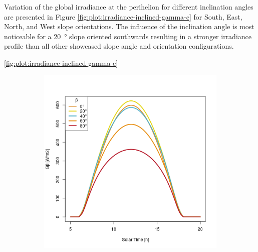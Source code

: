 Variation of the global irradiance at the perihelion for different inclination angles are presented in Figure \ref{fig:plot:irradiance-inclined-gamma-c} for South, East, North, and West slope orientations. The influence of the inclination angle is most noticeable for a \SI{20}{\degree} slope oriented southwards resulting in a stronger irradiance profile than all other showcased slope angle and orientation configurations.

\ref{fig:plot:irradiance-inclined-gamma-c}

\begin{figure}[H]
\vspace{-2ex}
	\centering
    \setlength{\subfigureWidth}{0.50\textwidth}
    \setlength{\graphicsHeight}{80mm}
    \hypersetup{hidelinks=true}%
  	\begin{subfigure}[t]{\subfigureWidth}
      \centering
  		\includegraphics[height=\graphicsHeight]{sections/martian-environment/plots/diurnal-irradiance-slope-angle-variation-1-for-ls-248-phi-2-tau-05-and-gammac-0.png}
  		\label{fig:sub:irradiance-inclined-gamma-c-0}
  	\end{subfigure}\hfill
    \begin{subfigure}[t]{\subfigureWidth}
      \centering

\end{subfigure}
\end{figure}
